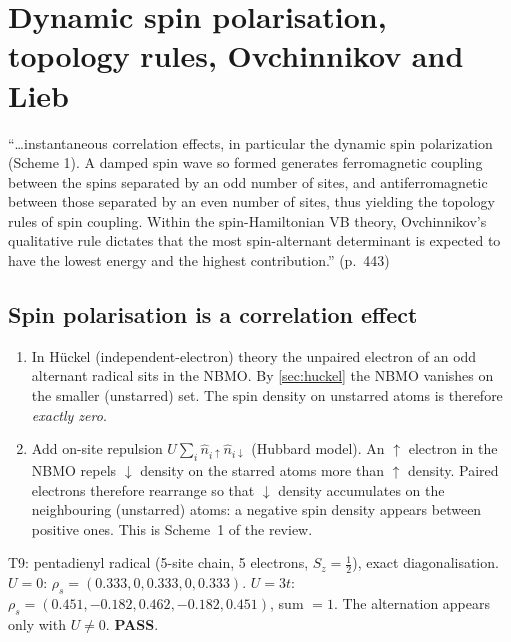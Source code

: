 \section{Dynamic spin polarisation, topology rules, Ovchinnikov and Lieb}\label{sec:spinpol}

\begin{reviewclaim}
``\dots instantaneous correlation effects, in particular the dynamic spin polarization (Scheme 1). A
damped spin wave so formed generates ferromagnetic coupling between the spins separated by an odd number
of sites, and antiferromagnetic between those separated by an even number of sites, thus yielding the
topology rules of spin coupling. Within the spin-Hamiltonian VB theory, Ovchinnikov's qualitative rule
dictates that the most spin-alternant determinant is expected to have the lowest energy and the highest
contribution.'' (p.~443)
\end{reviewclaim}

\subsection{Spin polarisation is a correlation effect}
\begin{enumerate}
  \item In Hückel (independent-electron) theory the unpaired electron of an odd alternant radical sits in
        the NBMO. By \cref{sec:huckel} the NBMO vanishes on the smaller (unstarred) set. The spin density on
        unstarred atoms is therefore \emph{exactly zero}.
  \item Add on-site repulsion $U\sum_i\hat n_{i\uparrow}\hat n_{i\downarrow}$ (Hubbard model). An $\uparrow$ electron
        in the NBMO repels $\downarrow$ density on the starred atoms more than $\uparrow$ density. Paired
        electrons therefore rearrange so that $\downarrow$ density accumulates on the neighbouring (unstarred)
        atoms: a negative spin density appears between positive ones. This is Scheme~1 of the review.
\end{enumerate}
\begin{verifybox}
T9: pentadienyl radical (5-site chain, 5 electrons, $S_z=\tfrac12$), exact diagonalisation.
$U=0$: $\rho_s=(0.333,0,0.333,0,0.333)$. $U=3t$: $\rho_s=(0.451,-0.182,0.462,-0.182,0.451)$, sum $=1$.
The alternation appears only with $U\neq0$. \textbf{PASS}.
\end{verifybox}

